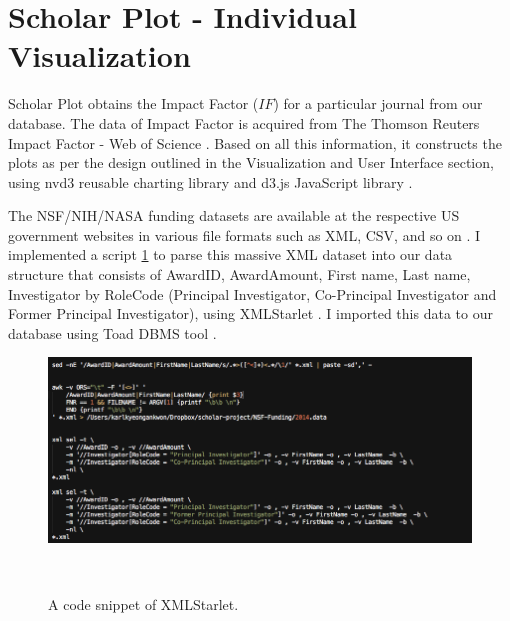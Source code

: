 \section{Scholar Plot - Individual Visualization}
Scholar Plot obtains the Impact Factor ($IF$) \cite{garfield2006history} for a particular journal from our database. The data of Impact Factor is acquired from The Thomson Reuters Impact Factor - Web of Science \cite{Thoms79:online}. Based on all this information, it constructs the plots as per the design outlined in the Visualization and User Interface section, using nvd3 reusable charting library \cite{nvd3org} and d3.js JavaScript library \cite{d3js}.


The NSF/NIH/NASA funding datasets are available at the respective US government websites in various file formats such as XML, CSV, and so on \cite{nsf, nih}. I implemented a script \ref{code-xml} to parse this massive XML dataset into our data structure that consists of AwardID, AwardAmount, First name, Last name, Investigator by RoleCode (Principal Investigator, Co-Principal Investigator and Former Principal Investigator), using XMLStarlet \cite{XMLStarlet}. I imported this data to our database using Toad DBMS tool \cite{Toadf85:online}. %

\begin{figure}
    \centering
    \includegraphics[width=1\textwidth]{figures/fig-code-xml.png}
    \caption{A code snippet of XMLStarlet.}~\label{code-xml}
\end{figure}


